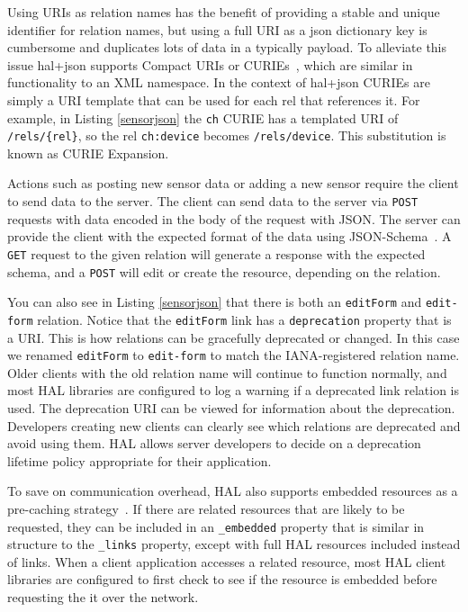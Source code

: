 \documentclass{acm_proc_article-sp}
\begin{document}
Using URIs as relation names has the benefit of providing a stable and unique
identifier for relation names, but using a full URI as a json dictionary key is
cumbersome and duplicates lots of data in a typically payload. To alleviate this
issue hal+json supports Compact URIs or CURIEs~\cite{curies}, which are similar in
functionality to an XML namespace. In the context of hal+json CURIEs are simply
a URI template that can be used for each rel that references it. For example,
in Listing \ref{sensorjson} the \texttt{ch} CURIE has a templated URI of
\texttt{/rels/\{rel\}}, so the rel \texttt{ch:device} becomes
\texttt{/rels/device}. This substitution is known as CURIE Expansion.

Actions such as posting new sensor data or adding a new sensor require the
client to send data to the server. The client can send data to the server via
\texttt{POST} requests with data encoded in the body of the request with JSON.
The server can provide the client with the expected format of the data using
JSON-Schema~\cite{json-schema-draft}. A \texttt{GET} request to the given
relation will generate a response with the expected schema, and a \texttt{POST}
will edit or create the resource, depending on the relation.

You can also see in Listing \ref{sensorjson} that there is both an
\mbox{\texttt{editForm}} and \texttt{edit-form} relation. Notice that the
\texttt{editForm} link has a \texttt{deprecation} property that is a URI.  This
is how relations can be gracefully deprecated or changed. In this case we
renamed \texttt{editForm} to \texttt{edit-form} to match the IANA-registered
relation name. Older clients with the old relation name will continue to
function normally, and most HAL libraries are configured to log a warning if a
deprecated link relation is used. The deprecation URI can be viewed for
information about the deprecation. Developers creating new clients can clearly
see which relations are deprecated and avoid using them. HAL allows server
developers to decide on a deprecation lifetime policy appropriate for their
application.

To save on communication overhead, HAL also supports embedded resources as a
pre-caching strategy~\cite{json-hal-draft}. If there are related resources that
are likely to be requested, they can be included in an \texttt{\_embedded}
property that is similar in structure to the \texttt{\_links} property, except
with full HAL resources included instead of links. When a client application
accesses a related resource, most HAL client libraries are configured to first
check to see if the resource is embedded before requesting the it over the
network.
\end{document}
